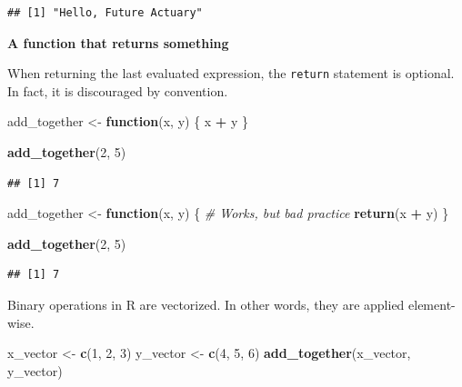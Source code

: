 \documentclass[
  openany]{book}
\newenvironment{Shaded}{\begin{snugshade}}{\end{snugshade}}
\newcommand{\CommentTok}[1]{\textcolor[rgb]{0.56,0.35,0.01}{\textit{#1}}}
\newcommand{\ControlFlowTok}[1]{\textcolor[rgb]{0.13,0.29,0.53}{\textbf{#1}}}
\newcommand{\DecValTok}[1]{\textcolor[rgb]{0.00,0.00,0.81}{#1}}
\newcommand{\KeywordTok}[1]{\textcolor[rgb]{0.13,0.29,0.53}{\textbf{#1}}}
\newcommand{\NormalTok}[1]{#1}
\newcommand{\OperatorTok}[1]{\textcolor[rgb]{0.81,0.36,0.00}{\textbf{#1}}}
\newcommand{\StringTok}[1]{\textcolor[rgb]{0.31,0.60,0.02}{#1}}
\begin{document}
\begin{verbatim}
## [1] "Hello, Future Actuary"
\end{verbatim}

\textbf{A function that returns something}

When returning the last evaluated expression, the \texttt{return} statement is optional.
In fact, it is discouraged by convention.

\begin{Shaded}
\begin{Highlighting}[]
\NormalTok{add_together <-}\StringTok{ }\ControlFlowTok{function}\NormalTok{(x, y) \{}
\NormalTok{  x }\OperatorTok{+}\StringTok{ }\NormalTok{y}
\NormalTok{\}}

\KeywordTok{add_together}\NormalTok{(}\DecValTok{2}\NormalTok{, }\DecValTok{5}\NormalTok{)}
\end{Highlighting}
\end{Shaded}

\begin{verbatim}
## [1] 7
\end{verbatim}

\begin{Shaded}
\begin{Highlighting}[]
\NormalTok{add_together <-}\StringTok{ }\ControlFlowTok{function}\NormalTok{(x, y) \{}
  \CommentTok{# Works, but bad practice}
  \KeywordTok{return}\NormalTok{(x }\OperatorTok{+}\StringTok{ }\NormalTok{y)}
\NormalTok{\}}

\KeywordTok{add_together}\NormalTok{(}\DecValTok{2}\NormalTok{, }\DecValTok{5}\NormalTok{)}
\end{Highlighting}
\end{Shaded}

\begin{verbatim}
## [1] 7
\end{verbatim}

Binary operations in R are vectorized. In other words, they are applied element-wise.

\begin{Shaded}
\begin{Highlighting}[]
\NormalTok{x_vector <-}\StringTok{ }\KeywordTok{c}\NormalTok{(}\DecValTok{1}\NormalTok{, }\DecValTok{2}\NormalTok{, }\DecValTok{3}\NormalTok{)}
\NormalTok{y_vector <-}\StringTok{ }\KeywordTok{c}\NormalTok{(}\DecValTok{4}\NormalTok{, }\DecValTok{5}\NormalTok{, }\DecValTok{6}\NormalTok{)}
\KeywordTok{add_together}\NormalTok{(x_vector, y_vector)}
\end{Highlighting}
\end{Shaded}
\end{document}
